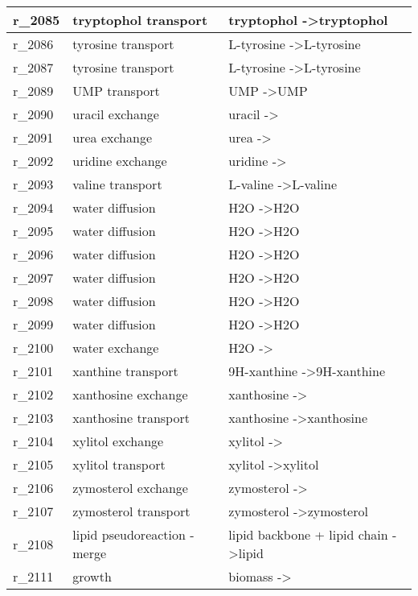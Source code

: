 \begin{landscape}
{\begin{longtable}{|l|p{7cm}|p{15cm}|}
r\_2085 & tryptophol transport & tryptophol  -\textgreater tryptophol \\ \hline
r\_2086 & tyrosine transport & L-tyrosine  -\textgreater L-tyrosine \\ \hline
r\_2087 & tyrosine transport & L-tyrosine  -\textgreater L-tyrosine \\ \hline
r\_2089 & UMP transport & UMP  -\textgreater UMP \\ \hline
r\_2090 & uracil exchange & uracil  -\textgreater{} \\ \hline
r\_2091 & urea exchange & urea  -\textgreater{} \\ \hline
r\_2092 & uridine exchange & uridine  -\textgreater{} \\ \hline
r\_2093 & valine transport & L-valine  -\textgreater L-valine \\ \hline
r\_2094 & water diffusion & H2O  -\textgreater H2O \\ \hline
r\_2095 & water diffusion & H2O  -\textgreater H2O \\ \hline
r\_2096 & water diffusion & H2O  -\textgreater H2O \\ \hline
r\_2097 & water diffusion & H2O  -\textgreater H2O \\ \hline
r\_2098 & water diffusion & H2O  -\textgreater H2O \\ \hline
r\_2099 & water diffusion & H2O  -\textgreater H2O \\ \hline
r\_2100 & water exchange & H2O  -\textgreater{} \\ \hline
r\_2101 & xanthine transport & 9H-xanthine  -\textgreater 9H-xanthine \\ \hline
r\_2102 & xanthosine exchange & xanthosine  -\textgreater{} \\ \hline
r\_2103 & xanthosine transport & xanthosine  -\textgreater xanthosine \\ \hline
r\_2104 & xylitol exchange & xylitol  -\textgreater{} \\ \hline
r\_2105 & xylitol transport & xylitol  -\textgreater xylitol \\ \hline
r\_2106 & zymosterol exchange & zymosterol  -\textgreater{} \\ \hline
r\_2107 & zymosterol transport & zymosterol  -\textgreater zymosterol \\ \hline
r\_2108 & lipid pseudoreaction - merge & lipid backbone + lipid chain  -\textgreater lipid \\ \hline
r\_2111 & growth & biomass  -\textgreater{} \\ \hline

\end{longtable}}
\end{landscape}
